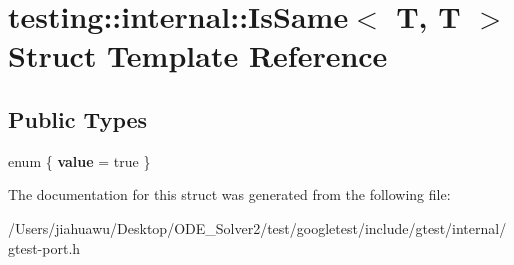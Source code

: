 \hypertarget{structtesting_1_1internal_1_1_is_same_3_01_t_00_01_t_01_4}{}\section{testing\+:\+:internal\+:\+:Is\+Same$<$ T, T $>$ Struct Template Reference}
\label{structtesting_1_1internal_1_1_is_same_3_01_t_00_01_t_01_4}
\subsection*{Public Types}
\begin{DoxyCompactItemize}
\item 
\mbox{\label{structtesting_1_1internal_1_1_is_same_3_01_t_00_01_t_01_4_a4f43bdb63adfd73e0a8cace4cc6368de}} 
enum \{ {\bfseries value} = true
 \}
\end{DoxyCompactItemize}


The documentation for this struct was generated from the following file\+:\begin{DoxyCompactItemize}
\item 
/\+Users/jiahuawu/\+Desktop/\+O\+D\+E\+\_\+\+Solver2/test/googletest/include/gtest/internal/gtest-\/port.\+h\end{DoxyCompactItemize}
